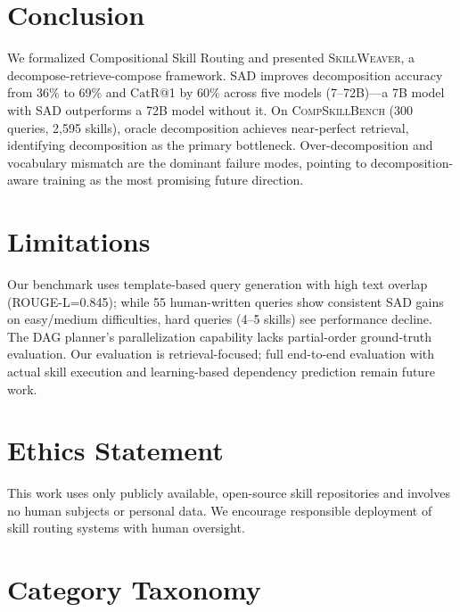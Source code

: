 \documentclass[11pt]{article}
\newcommand{\system}{\textsc{SkillWeaver}}
\newcommand{\benchmark}{\textsc{CompSkillBench}}
\newcommand{\catrecall}{\text{CatR}}
\begin{document}
\section{Conclusion}
\label{sec:conclusion}

We formalized Compositional Skill Routing and presented \system{}, a decompose-retrieve-compose framework.
SAD improves decomposition accuracy from 36\% to 69\% and $\catrecall$@1 by 60\% across five models (7--72B)---a 7B model with SAD outperforms a 72B model without it.
On \benchmark{} (300 queries, 2{,}595 skills), oracle decomposition achieves near-perfect retrieval, identifying decomposition as the primary bottleneck.
Over-decomposition and vocabulary mismatch are the dominant failure modes, pointing to decomposition-aware training as the most promising future direction.

\section*{Limitations}

Our benchmark uses template-based query generation with high text overlap (ROUGE-L=0.845); while 55 human-written queries show consistent SAD gains on easy/medium difficulties, hard queries (4--5 skills) see performance decline.
The DAG planner's parallelization capability lacks partial-order ground-truth evaluation.
Our evaluation is retrieval-focused; full end-to-end evaluation with actual skill execution and learning-based dependency prediction remain future work.

\section*{Ethics Statement}

This work uses only publicly available, open-source skill repositories and involves no human subjects or personal data.
We encourage responsible deployment of skill routing systems with human oversight.



\appendix

\section{Category Taxonomy}
\label{app:categories}
\end{document}

